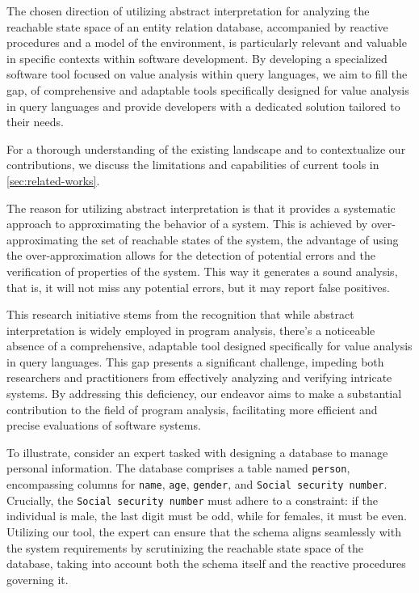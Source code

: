 
The chosen direction of utilizing abstract interpretation for analyzing the reachable state space of an entity relation database, accompanied by reactive procedures and a model of the environment, is particularly relevant and valuable in specific contexts within software development.
By developing a specialized software tool focused on value analysis within query languages, we aim to fill the gap,  of comprehensive and adaptable tools specifically designed for value analysis in query languages and provide developers with a dedicated solution tailored to their needs.

For a thorough understanding of the existing landscape and to contextualize our contributions, we discuss the limitations and capabilities of current tools in \autoref{sec:related-works}.


The reason for utilizing abstract interpretation is that it provides a systematic approach to approximating the behavior of a system.
This is achieved by over-approximating the set of reachable states of the system, the advantage of using the over-approximation allows for the detection of potential errors and the verification of properties of the system.
This way it generates a sound analysis, that is, it will not miss any potential errors, but it may report false positives.



This research initiative stems from the recognition that while abstract interpretation is widely employed in program analysis, there's a noticeable absence of a comprehensive, adaptable tool designed specifically for value analysis in query languages.
This gap presents a significant challenge, impeding both researchers and practitioners from effectively analyzing and verifying intricate systems.
By addressing this deficiency, our endeavor aims to make a substantial contribution to the field of program analysis, facilitating more efficient and precise evaluations of software systems.

To illustrate, consider an expert tasked with designing a database to manage personal information.
The database comprises a table named \texttt{person}, encompassing columns for \texttt{name}, \texttt{age}, \texttt{gender}, and \texttt{Social security number}.
Crucially, the \texttt{Social security number} must adhere to a constraint: if the individual is male, the last digit must be odd, while for females, it must be even.
Utilizing our tool, the expert can ensure that the schema aligns seamlessly with the system requirements by scrutinizing the reachable state space of the database, taking into account both the schema itself and the reactive procedures governing it.

